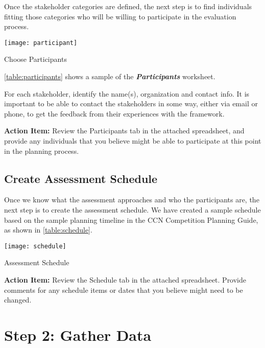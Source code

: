 Once the stakeholder categories are defined, the next step is to find
individuals fitting those categories who will be willing to
participate in the evaluation process. 

\begin{table}[ht!]
  \center
  \texttt{[image: participant]}
  \caption{Choose Participants}
  \label{table:participants}
\end{table}

\autoref{table:participants} shows a sample of the \textbf{\textit{Participants}} worksheet. 

For each stakeholder, identify the name(s), organization and contact
info. It is important to be able to contact the stakeholders in some
way, either via email or phone, to get the feedback from their
experiences with the framework.

\begin{shadebox}
{\bf Action Item:} Review the Participants tab in the attached
spreadsheet, and provide any individuals that you believe might be
able to participate at this point in the planning process.
\end{shadebox}

\subsection{Create Assessment Schedule}

Once we know what the assessment approaches and who the participants are, the next step is to create the assessment 
schedule. We have created a sample schedule based on the sample
planning timeline in the CCN Competition Planning Guide, as shown in
\autoref{table:schedule}. 

\begin{table}[ht!]
  \center
  \texttt{[image: schedule]}
  \caption{Assessment Schedule}
  \label{table:schedule}
\end{table}

\begin{shadebox}
{\bf Action Item:} Review the Schedule tab in the attached
spreadsheet.  Provide comments for any schedule items or dates that
you believe might need to be changed. 
\end{shadebox}

\section{Step 2: Gather Data}

